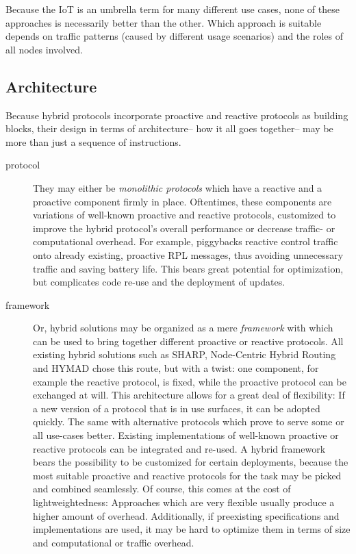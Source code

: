 \documentclass[a4paper,10pt]{scrartcl}
\begin{document}

Because the IoT is an umbrella term for many different use cases, none of these approaches is necessarily better than the other. Which approach is suitable depends on traffic patterns (caused by different usage scenarios) and the roles of all nodes involved.%

\subsection{Architecture}
\label{subsec:architecture}
Because hybrid protocols incorporate proactive and reactive protocols as building blocks, their design in terms of architecture-- how it all goes together-- may be more than just a sequence of instructions.
\begin{description}
\item[protocol] They may either be \emph{monolithic protocols} which have a reactive and a proactive component firmly in place. Oftentimes, these components are variations of well-known proactive and reactive protocols, customized to improve the hybrid protocol's overall performance or decrease traffic- or computational overhead. For example, \cite{baccelli_p2p_rpl} piggybacks reactive control traffic onto already existing, proactive RPL messages, thus avoiding unnecessary traffic and saving battery life. %
This bears great potential for optimization, but complicates code re-use and the deployment of updates.\\
\item[framework] Or, hybrid solutions may be organized as a mere \emph{framework} with which can be used to bring together different proactive or reactive protocols. All existing hybrid solutions such as SHARP, Node-Centric Hybrid Routing and HYMAD chose this route, but with a twist: one component, for example the reactive protocol, is fixed, while the proactive protocol can be exchanged at will. This architecture allows for a great deal of flexibility: If a new version of a protocol that is in use surfaces, it can be adopted quickly. The same with alternative protocols which prove to serve some or all use-cases better. Existing implementations of well-known proactive or reactive protocols can be integrated and re-used.
A hybrid framework bears the possibility to be customized for certain deployments, because the most suitable proactive and reactive protocols for the task may be picked and combined seamlessly.
Of course, this comes at the cost of lightweightedness: Approaches which are very flexible usually produce a higher amount of overhead. Additionally, if preexisting specifications and implementations are used, it may be hard to optimize them in terms of size and computational or traffic overhead.
\end{description}
\end{document}
